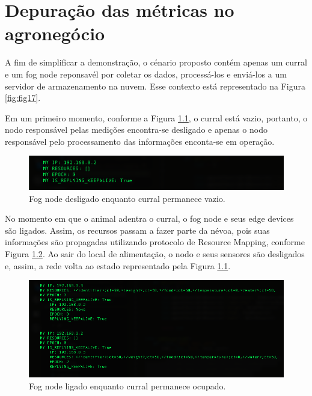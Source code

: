 \documentclass[portuguese,oneside]{tcc}
\begin{document}
  \anexos
  \chapter{Depuração das métricas no agronegócio}
  
A fim de simplificar a demonstração, o cénario proposto contém apenas um curral e um fog node reponsavél por coletar os dados, processá-los e enviá-los a um servidor de armazenamento na nuvem.
Esse contexto está representado na Figura \ref{fig:fig17}.

Em um primeiro momento, conforme a Figura \ref{fig:fig18}, o curral está vazio, portanto, o nodo responsável pelas medições encontra-se desligado e apenas o nodo responsável 
pelo processamento das informações enconta-se em operação.

\begin{figure}[H]
  \centering\includegraphics[width=.9\textwidth]{fig18.png}
  \caption [Fog node desligado enquanto curral permanece vazio]
  {\label{fig:fig18} Fog node desligado enquanto curral permanece vazio.}
\end{figure}

No momento em que o animal adentra o curral, o fog node e seus edge devices são ligados.
Assim, os recursos passam a fazer parte da névoa, pois suas informações são propagadas utilizando protocolo de Resource Mapping, conforme Figura \ref{fig:fig19}.
Ao sair do local de alimentação, o nodo e seus sensores são desligados e, assim, a rede volta ao estado representado pela Figura \ref{fig:fig18}.

\begin{figure}[H]
  \centering\includegraphics[width=.9\textwidth]{fig19.png}
  \caption [Fog node ligado enquanto curral permanece ocupado]
  {\label{fig:fig19} Fog node ligado enquanto curral permanece ocupado.}
\end{figure}

  
  
\end{document}
